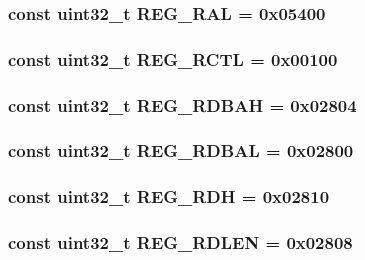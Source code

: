 \label{namespaceiGbReg_afbf8013fc467361c016303bdeeab4255}
\hypertarget{namespaceiGbReg_a9e6308c54a1c811135394041894921da}{
\subsubsection[{REG\_\-RAL}]{\setlength{\rightskip}{0pt plus 5cm}const {\bf uint32\_\-t} {\bf REG\_\-RAL} = 0x05400}}
\label{namespaceiGbReg_a9e6308c54a1c811135394041894921da}
\hypertarget{namespaceiGbReg_a9b7b0830333db7d62d77d4baab8628cb}{
\subsubsection[{REG\_\-RCTL}]{\setlength{\rightskip}{0pt plus 5cm}const {\bf uint32\_\-t} {\bf REG\_\-RCTL} = 0x00100}}
\label{namespaceiGbReg_a9b7b0830333db7d62d77d4baab8628cb}
\hypertarget{namespaceiGbReg_ac8a837e0dbaf3e028db7609cf2318f10}{
\subsubsection[{REG\_\-RDBAH}]{\setlength{\rightskip}{0pt plus 5cm}const {\bf uint32\_\-t} {\bf REG\_\-RDBAH} = 0x02804}}
\label{namespaceiGbReg_ac8a837e0dbaf3e028db7609cf2318f10}
\hypertarget{namespaceiGbReg_a4e047b0e945c6d8b534316c82c521bd1}{
\subsubsection[{REG\_\-RDBAL}]{\setlength{\rightskip}{0pt plus 5cm}const {\bf uint32\_\-t} {\bf REG\_\-RDBAL} = 0x02800}}
\label{namespaceiGbReg_a4e047b0e945c6d8b534316c82c521bd1}
\hypertarget{namespaceiGbReg_a281c8814cfaf1f24aba3ec4e47843b6e}{
\subsubsection[{REG\_\-RDH}]{\setlength{\rightskip}{0pt plus 5cm}const {\bf uint32\_\-t} {\bf REG\_\-RDH} = 0x02810}}
\label{namespaceiGbReg_a281c8814cfaf1f24aba3ec4e47843b6e}
\hypertarget{namespaceiGbReg_adef77c18ff90a18f8c6fe73f0e61f7fa}{
\subsubsection[{REG\_\-RDLEN}]{\setlength{\rightskip}{0pt plus 5cm}const {\bf uint32\_\-t} {\bf REG\_\-RDLEN} = 0x02808}}
